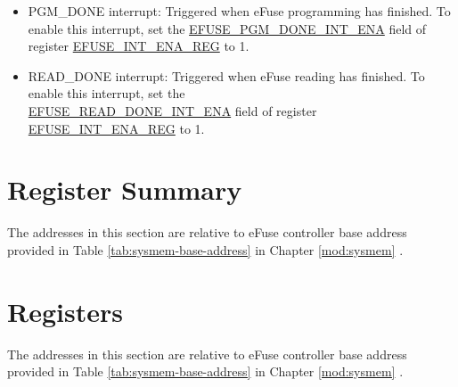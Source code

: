 \documentclass[main\_\_EN.tex]{subfiles}
\begin{document}
\begin{itemize}
\item PGM\_DONE interrupt: Triggered when eFuse programming has finished. To enable this interrupt, set the \hyperref[fielddesc:EFUSEPGMDONEINTENA]{EFUSE\_PGM\_DONE\_INT\_ENA} field of register \hyperref[regdesc:EFUSEINTENAREG]{EFUSE\_INT\_ENA\_REG} to 1.
\item READ\_DONE interrupt: Triggered when eFuse reading has finished. To enable this interrupt, set the \\\hyperref[fielddesc:EFUSEREADDONEINTENA]{EFUSE\_READ\_DONE\_INT\_ENA} field of register \hyperref[regdesc:EFUSEINTENAREG]{EFUSE\_INT\_ENA\_REG} to 1.
\end{itemize}



\newpage
\section{Register Summary}
\label{sec:efuse-reg-summ}
\hypertarget{efuse-reg-summ}{}

The addresses in this section are relative to eFuse controller base address provided in Table \ref{tab:sysmem-base-address} in Chapter \ref{mod:sysmem} \textit{}.





\newpage
\section{Registers}

The addresses in this section are relative to eFuse controller base address provided in Table \ref{tab:sysmem-base-address} in Chapter \ref{mod:sysmem} \textit{}.


\end{document}
